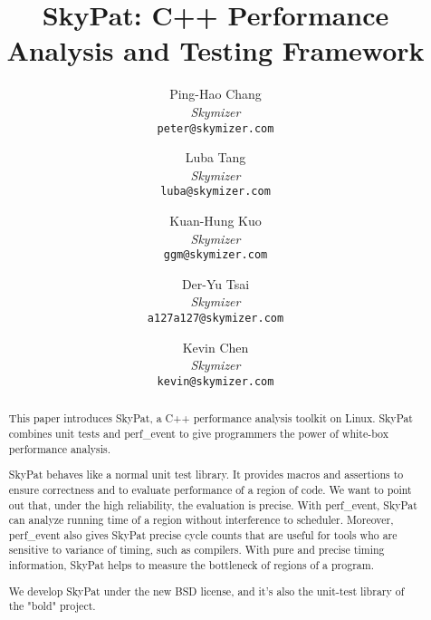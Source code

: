 \documentclass[final]{ols}
\begin{document}
\title{SkyPat: C++ Performance Analysis and Testing Framework}
\subtitle{}

\author{
	Ping-Hao Chang \\
	{\em Skymizer}\\
	{\tt\small peter@skymizer.com}\\
\and
	Luba Tang\\
	{\em Skymizer}\\
	{\tt\small luba@skymizer.com}\\
\and
	Kuan-Hung Kuo\\
	{\em Skymizer}\\
	{\tt\small ggm@skymizer.com}\\
\and
	Der-Yu Tsai\\
	{\em Skymizer}\\
	{\tt\small a127a127@skymizer.com}\\
\and
	Kevin Chen\\
	{\em Skymizer}\\
	{\tt\small kevin@skymizer.com}
}

\date{} %

\maketitle


\begin{abstract}
This paper introduces SkyPat, a C++ performance analysis toolkit on Linux. 
SkyPat combines unit tests and perf\_event to give programmers the power of white-box performance analysis.

SkyPat behaves like a normal unit test library. 
It provides macros and assertions to ensure correctness and to evaluate performance of a region of code. 
We want to point out that, under the high reliability, the evaluation is precise. 
With perf\_event, SkyPat can analyze running time of a region without interference to scheduler. 
Moreover, perf\_event also gives SkyPat precise cycle counts that are useful for tools who are sensitive to variance of timing, such as compilers.
With pure and precise timing information, SkyPat helps to measure the bottleneck of regions of a program.

We develop SkyPat under the new BSD license, and it's also the unit-test library of the "bold" project.
\end{abstract}
\end{document}
